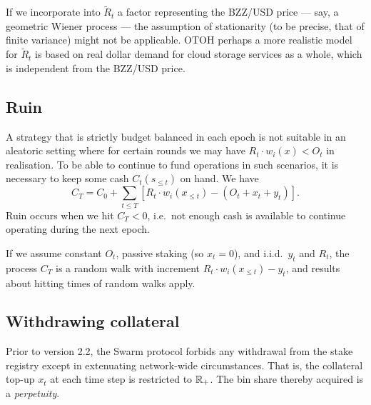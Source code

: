 \begin{remark}

  If we incorporate into $\tilde R_t$ a factor representing the BZZ/USD price --- say, a geometric Wiener process --- the assumption of stationarity (to be precise, that of finite variance) might not be applicable.
  OTOH perhaps a more realistic model for $\tilde R_t$ is based on real dollar demand for cloud storage services as a whole, which is independent from the BZZ/USD price.

\end{remark}

\subsection{Ruin}

A strategy that is strictly budget balanced in each epoch is not suitable in an aleatoric setting where for certain rounds we may have $R_t\cdot w_i(x) < O_t$ in realisation.
%
To be able to continue to fund operations in such scenarios, it is necessary to keep some cash $C_t(s_{\leq t})$ on hand.
%
We have
\[
  C_T = C_0 + \sum_{t\leq T} \left[ R_t\cdot w_i(x_{\leq t}) - (O_t + x_t + y_t) \right].
\]
Ruin occurs when we hit $C_T < 0$, i.e.~not enough cash is available to continue operating during the next epoch.

If we assume constant $O_t$, passive staking (so $x_t = 0$), and i.i.d.~$y_t$ and $R_t$, the process $C_T$ is a random walk with increment $R_t\cdot w_i(x_{\leq t}) - y_t$, and results about hitting times of random walks apply.

\subsection{Withdrawing collateral}

Prior to version 2.2, the Swarm protocol forbids any withdrawal from the stake registry except in extenuating network-wide circumstances.
%
That is, the collateral top-up $x_t$ at each time step is restricted to $\mathbb{R}_+$.
%
The bin share thereby acquired is a \emph{perpetuity}.

